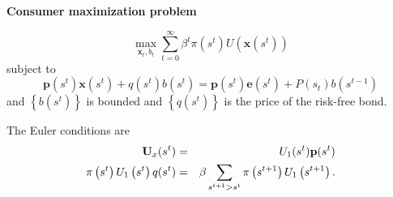 \documentclass[thmsb,11pt]{article}
\begin{document}
\textbf{Consumer maximization problem}

\begin{equation}
\max_{\mathbf{x}_{t},b_{t}}\sum_{t=0}^{\infty }\beta ^{t}\pi\left(
s^{t}\right) U(\mathbf{x}\left( s^{t}\right) )
\label{Tech appendix: consumer maximization}
\end{equation}%
subject to%
\begin{equation}
\label{Tech appendix: budget constraint}
\mathbf{p}\left( s^{t}\right) \mathbf{x}\left( s^{t}\right) +q(s^{t})b\left(
s^{t}\right) =\mathbf{p}\left( s^{t}\right) \mathbf{e}\left( s^{t}\right)
+P(s_t)b\left( s^{t-1}\right)
\end{equation}%
and $\left \{ b\left( s^{t}\right) \right \} $ is bounded and $\left \{
q(s^{t})\right \} $ is the price of the risk-free bond.

The Euler conditions are%
\begin{eqnarray}
\mathbf{U}_{x}(s^{t}) &=&U_{1}(s^{t})\mathbf{p}(s^{t})
\label{Tech appendix: Euler} \\
\pi \left( s^{t}\right) U_{1}\left( s^{t}\right) q(s^{t}) &=&\beta
\sum_{s^{t+1}>s^{t}}\pi \left( s^{t+1}\right) U_{1}\left( s^{t+1}\right) .
\notag
\end{eqnarray}
\end{document}
